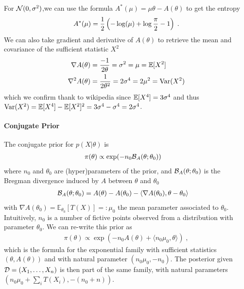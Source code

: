 \documentclass{article}
\newenvironment{example}{
	\begin{mdframed}[backgroundcolor=light-gray, roundcorner=5pt]
}{		
	\end{mdframed}
}
\newcommand*{\expect}[2][]{\ensuremath{\mathbb{E}_{#1} \left[ #2 \right] }} %
\newcommand{\logpart}{A}
\newcommand{\conj}{\logpart^*}
\newcommand{\bregman}{\cB_\logpart}
\newcommand{\natp}{\theta}
\newcommand{\meanp}{\mu}
\begin{document}
\begin{example}
For ${\mathcal N}(0,\sigma^2)$,we can use the formula $\conj(\mu) = \mu \natp - \logpart(\natp)$ to get the entropy
\begin{align}
	\conj(\mu) = \half\left( -\log(\mu) + \log\frac{\pi}{2} - 1 \right) \; .
\end{align}
We can also take gradient and derivative of $\logpart(\natp)$ to retrieve the mean and covariance of the sufficient statistic $X^2$
\begin{align}
	\nabla\logpart(\natp) &= \frac{-1}{2 \natp} = \sigma^2 = \mu = \E[X^2] \\
	\nabla^2\logpart(\natp) &= \frac{1}{2 \natp^2} = 2 \sigma^4 = 2 \mu^2 = \Var(X^2) 
\end{align}
which we confirm thank to wikipedia since $\operatorname{\mathbb{E}}[X^4] = 3 \sigma^4$ and thus $\operatorname{\mathrm{Var}}(X^2) = \operatorname{\mathbb{E}}[X^4] - \operatorname{\mathbb{E}}[X^2]^2 = 3 \sigma^4 - \sigma^4 = 2 \sigma^4$.
\end{example}

\paragraph{Conjugate Prior}
The conjugate prior for $p(X|\natp)$ is
\begin{align}
    \pi(\natp) &\propto \exp( - n_0 \bregman(\natp ; \natp_0) )
\end{align}
where $n_0$ and $\natp_0$ are (hyper)parameters of the prior, and $\bregman(\natp ; \natp_0)$ is the Bregman divergence induced by $\logpart$ between $\natp$ and $\natp_0$
\begin{align}
    \bregman (\natp ; \natp_0)
    & = \logpart(\natp) - \logpart(\natp_0) 
    - \langle \nabla \logpart(\natp_0)  , \natp - \natp_0 \rangle
\end{align}
with $\nabla \logpart(\natp_0) = \expect[\natp_0]{T(X)} =: \meanp_0$ the mean parameter associated to $\natp_0$. 
Intuitively, $n_0$ is a number of fictive points observed from a distribution with parameter $\natp_0$.
We can re-write this prior as 
\begin{align}
    \pi(\natp) \propto 
    \exp( -n_0 \logpart (\natp) 
    + \langle n_0 \mu_0, \natp \rangle ) \; ,
\end{align}
which is the formula for the exponential family with sufficient statistics $(\natp ,\logpart(\natp))$ and with natural parameter $(n_0 \mu_0, -n_0)$.
The posterior given ${\mathcal D}=(X_1,\dots, X_n)$ is then part of the same family, with natural parameters $(n_0 \mu_0 + \sum_i T(X_i) , -(n_0 + n))$.
\end{document}
